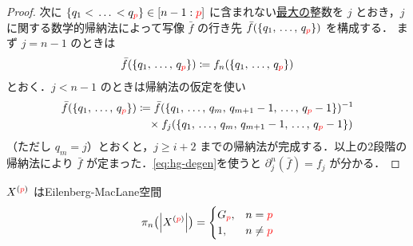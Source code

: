 \documentclass[TQFT_main]{subfiles}
\begin{document}
\begin{proof}
    次に $\{q_1 <\, \dots \, < q_{\textcolor{red}{p}}\} \in [n-1:\textcolor{red}{p}]$ に含まれない\underline{最大の}整数を $j$ とおき，$j$ に関する数学的帰納法によって写像 $\bar{f}$ の行き先 $\bar{f}(\{q_1,\, \dots,\, q_{\textcolor{red}{p}}\})$ を構成する．
    まず $j=n-1$ のときは
    \begin{align}
        \bar{f}(\{q_1,\, \dots,\, q_{\textcolor{red}{p}}\}) \coloneqq f_{n} (\{q_1,\, \dots,\, q_{\textcolor{red}{p}}\})
    \end{align}
    とおく．$j<n-1$ のときは帰納法の仮定を使い
    \begin{align}
        \bar{f}(\{q_1,\, \dots,\, q_{\textcolor{red}{p}}\}) 
        &\coloneqq \bar{f} (\{q_1,\, \dots,\, q_{m},\, q_{m+1}-1,\, \dots,\, q_{\textcolor{red}{p}}-1\})^{-1} \\
        &\quad \times f_{j} (\{q_1,\, \dots,\, q_m,\, q_{m+1} - 1,\, \dots,\, q_{\textcolor{red}{p}} - 1\})
    \end{align}
    （ただし $q_m = j$）とおくと，$j \ge i+2$ までの帰納法が完成する．以上の2段階の帰納法により $\bar{f}$ が定まった．\eqref{eq:hg-degen}を使うと $\partial^n_j (\bar{f}) = f_j$ が分かる．
\end{proof}

\begin{mytheo}[label=thm:hg-EilenbergMacLane]{$X^{(\textcolor{red}{p})}$ はEilenberg-MacLane空間}
    \begin{align}
        \pi_n\bigl(\abs{X^{(\textcolor{red}{p})}}\bigr) =
        \begin{cases}
            G_{\textcolor{red}{p}},  &n = \textcolor{red}{p} \\
            1, &n \neq \textcolor{red}{p}
        \end{cases}        
    \end{align}
\end{mytheo}
\end{document}
